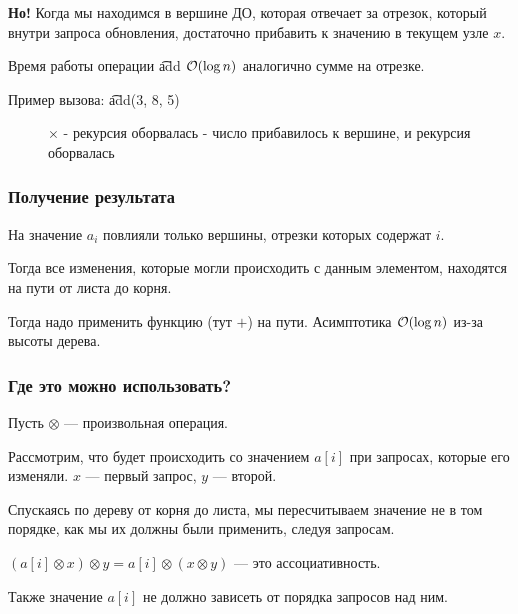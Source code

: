 {\bf Но!} Когда мы находимся в вершине ДО, которая отвечает за отрезок, который внутри запроса обновления, достаточно прибавить к значению в текущем узле $x$.

Время работы операции \t{add} $ \mathcal{O}(\log n)$ аналогично сумме на отрезке.
\down

Пример вызова: \t{add(3, 8, 5)}
\up \up
\begin{center}
	\begin{figure}[h]
		\captionsetup{font=small, labelformat=empty}
		\caption{$\times$ - рекурсия оборвалась \checkmark - число прибавилось к вершине, и рекурсия оборвалась}
		\label{fig:image}
	\end{figure}
\end{center}

\subsubsection{Получение результата}

На значение $a_i$ повлияли только вершины, отрезки которых содержат $i$.

Тогда все изменения, которые могли происходить с данным элементом, находятся на пути от листа до корня. 

Тогда надо применить функцию (тут $+$) на пути. Асимптотика $\mathcal{O}(\log n)$ из-за высоты дерева.

\subsubsection{Где это можно использовать?}

Пусть $\otimes$ --- произвольная операция.

Рассмотрим, что будет происходить со значением $a[i]$ при запросах, которые его изменяли. $x$ --- первый запрос, $y$ --- второй.
\down

Спускаясь по дереву от корня до листа, мы пересчитываем значение не в том порядке, как мы их должны были применить, следуя запросам.

$(a[i] \otimes x) \otimes y = a[i] \otimes (x \otimes y)$ --- это ассоциативность.

Также значение $a[i]$ не должно зависеть от порядка запросов над ним.

